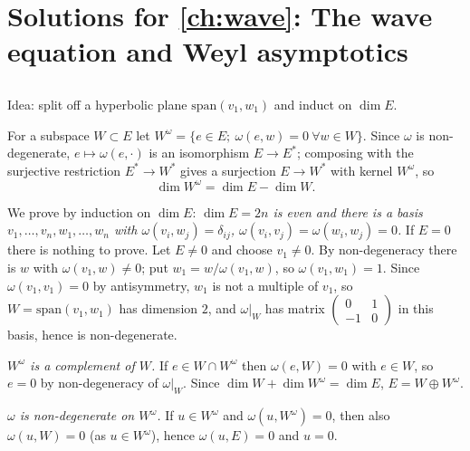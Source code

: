 \providecommand{\vol}{\operatorname{vol}}
\providecommand{\inj}{\operatorname{inj}}
\providecommand{\Lset}{\mathcal{L}}
\providecommand{\osc}[1]{\mathcal{I}[#1]}

\section{Solutions for \cref{ch:wave}: The wave equation and Weyl asymptotics}\label{solutions:wave}

\subsection*{}
Idea: split off a hyperbolic plane $\mathrm{span}(v_1,w_1)$ and induct on $\dim E$.

For a subspace $W\subset E$ let $W^\omega=\{e\in E;\ \omega(e,w)=0\ \forall w\in W\}$. Since
$\omega$ is non-degenerate, $e\mapsto\omega(e,\cdot)$ is an isomorphism $E\to E^*$; composing
with the surjective restriction $E^*\to W^*$ gives a surjection $E\to W^*$ with kernel
$W^\omega$, so
\begin{equation*}
  \dim W^\omega=\dim E-\dim W .
\end{equation*}

We prove by induction on $\dim E$: \emph{$\dim E=2n$ is even and there is a basis
$v_1,\dots,v_n,w_1,\dots,w_n$ with $\omega(v_i,w_j)=\delta_{ij}$,
$\omega(v_i,v_j)=\omega(w_i,w_j)=0$.} If $E=0$ there is nothing to prove. Let $E\ne0$ and
choose $v_1\ne0$. By non-degeneracy there is $w$ with $\omega(v_1,w)\ne0$; put
$w_1=w/\omega(v_1,w)$, so $\omega(v_1,w_1)=1$. Since $\omega(v_1,v_1)=0$ by antisymmetry,
$w_1$ is not a multiple of $v_1$, so $W=\mathrm{span}(v_1,w_1)$ has dimension $2$, and
$\omega|_W$ has matrix $\left(\begin{smallmatrix}0&1\\-1&0\end{smallmatrix}\right)$ in this basis,
hence is non-degenerate.

\emph{$W^\omega$ is a complement of $W$.} If $e\in W\cap W^\omega$ then $\omega(e,W)=0$ with
$e\in W$, so $e=0$ by non-degeneracy of $\omega|_W$. Since
$\dim W+\dim W^\omega=\dim E$, $E=W\oplus W^\omega$.

\emph{$\omega$ is non-degenerate on $W^\omega$.} If $u\in W^\omega$ and $\omega(u,W^\omega)=0$,
then also $\omega(u,W)=0$ (as $u\in W^\omega$), hence $\omega(u,E)=0$ and $u=0$.

